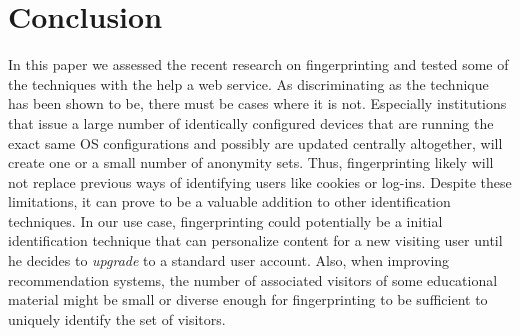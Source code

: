 \section{Conclusion} %
\label{sec:conclusion}

In this paper we assessed the recent research on fingerprinting and tested some of the techniques with the help a web service. As discriminating as the technique has been shown to be, there must be cases where it is not. Especially institutions that issue a large number of identically configured devices that are running the exact same OS configurations and possibly are updated centrally altogether, will create one or a small number of anonymity sets. Thus, fingerprinting likely will not replace previous ways of identifying users like cookies or log-ins. Despite these limitations, it can prove to be a valuable addition to other identification techniques. In our use case, fingerprinting could potentially be a initial identification technique that can personalize content for a new visiting user until he decides to \textit{upgrade} to a standard user account. Also, when improving recommendation systems, the number of associated visitors of some educational material might be small or diverse enough for fingerprinting to be sufficient to uniquely identify the set of visitors. 

